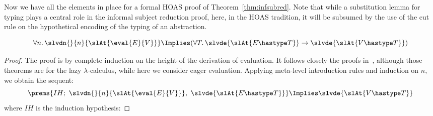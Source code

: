 \documentclass[final]{svjour3}
\begin{document}
Now we have all the elements in place for a formal HOAS
proof of Theorem~\ref{thm:infsubred}.
Note that while a substitution lemma for typing plays a central
role in the informal subject reduction proof, here, in the HOAS tradition, it
will be subsumed by the use of the cut rule on the hypothetical encoding of the
typing of an abstraction.
\begin{goal}
  $$\forall n.\, \slvdn{}{n}{\slAt{\eval{E}{V}}} \Implies(\forall T.\,
  \slvde{\slAt{E\hastype T}} \to  \slvde{\slAt{V\hastype T}})$$
\label{mcthm:olsr}
\end{goal}
\begin{proof}
  The proof is by complete induction on the
  height of the derivation of evaluation.  It follows closely the
  proofs in~\cite{Felty02,McDowell01}, although those theorems are for
  the lazy $\lambda$-calculus, 
  while here we consider eager evaluation.  Applying meta-level
  introduction rules and induction on $n$, we obtain the sequent:
$$\prems{IH;\,\,\slvdn{}{n}{\slAt{\eval{E}{V}}},\,\,
  \slvde{\slAt{E\hastype T}}} \Implies \slvde{\slAt{V\hastype T}}$$
where $IH$ is the induction hypothesis:


\end{proof}
\end{document}
